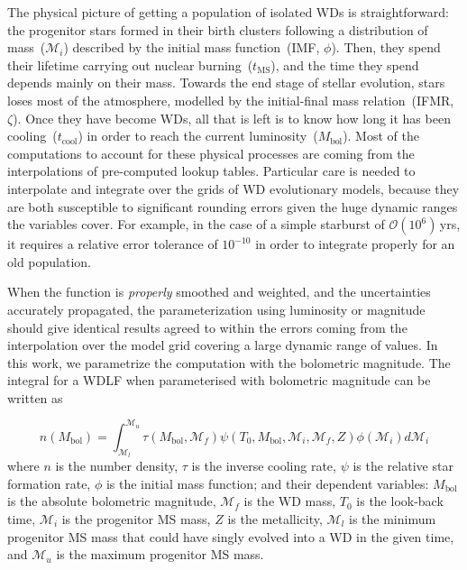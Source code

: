 \documentclass[fleqn,usenatbib]{mnras}
\begin{document}
The physical picture of getting a population of isolated WDs is
straightforward: the progenitor stars formed in their birth clusters
following a distribution of mass~($\mathcal{M}_i$) described by the initial
mass function~(IMF, $\phi$). Then, they spend their lifetime carrying out
nuclear burning~($t_{\mathrm{MS}}$), and the time they spend depends mainly
on their mass. Towards the end stage of stellar evolution, stars loses most
of the atmosphere, modelled by the initial-final mass relation~(IFMR,
$\zeta$). Once they have become WDs, all that is left is to know how long it
has been cooling~($t_{\mathrm{cool}}$) in order to reach the current
luminosity~($M_\mathrm{bol}$). Most of the computations to account for these
physical processes are coming from the interpolations of pre-computed lookup
tables. Particular care is needed to interpolate and integrate over the
grids of WD evolutionary models, because they are both susceptible to
significant rounding errors given the huge dynamic ranges the variables cover.
For example, in the case of a simple starburst of $\mathcal{O}(10^6)$\,yrs, it
requires a relative error tolerance of $10^{-10}$ in order to integrate properly
for an old population.

When the function is \textit{properly} smoothed and weighted, and the
uncertainties accurately propagated, the parameterization using luminosity or
magnitude should give identical results agreed to within the errors coming from
the interpolation over the model grid covering a large dynamic range of values.
In this work, we parametrize the computation with the bolometric magnitude. The
integral for a WDLF when parameterised with bolometric magnitude can be written
as

\begin{equation} \label{eqn:wdlf}
    n(M_{\mathrm{bol}}) = \int_{\mathcal{M}_l}^{\mathcal{M}_u}
        \tau(M_\mathrm{bol}, \mathcal{M}_f)
        \psi(T_0, M_\mathrm{bol}, \mathcal{M}_i, \mathcal{M}_f, Z)
        \phi(\mathcal{M}_i) d\mathcal{M}_i
\end{equation}
where $n$ is the number density, $\tau$ is the inverse cooling rate, $\psi$ is
the relative star formation rate, $\phi$ is the initial mass function; and their
dependent variables: $M_\mathrm{bol}$ is the absolute bolometric
magnitude, $\mathcal{M}_f$ is the WD mass, $T_0$ is the look-back time, $\mathcal{M}_i$ is
the progenitor MS mass, $Z$ is the metallicity, $\mathcal{M}_l$ is the minimum
progenitor MS mass that could have singly evolved into a WD in the given time,
and $\mathcal{M}_u$ is the maximum progenitor MS mass.
\end{document}
